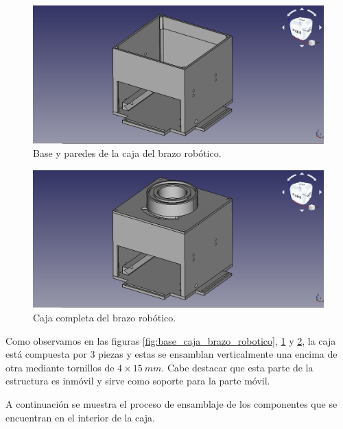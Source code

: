 \begin{figure}[H]
    \centering 
    \includegraphics[width=1\linewidth]{pictures/BaseYParedes.png}
    \caption{Base y paredes de la caja del brazo robótico.}
    \label{fig:base_paredes_caja_brazo_robotico}
\end{figure}

\begin{figure}[H]
    \centering 
    \includegraphics[width=1\linewidth]{pictures/CajaCompleta.png}
    \caption{Caja completa del brazo robótico.}
    \label{fig:caja_completa_brazo_robotico}
\end{figure}

Como observamos en las figuras \ref{fig:base_caja_brazo_robotico}, \ref{fig:base_paredes_caja_brazo_robotico} y \ref{fig:caja_completa_brazo_robotico}, la caja está compuesta por 3 piezas y estas se ensamblan verticalmente una encima de otra mediante tornillos de $4 \times 15~mm$.
Cabe destacar que esta parte de la estructura es inmóvil y sirve como soporte para la parte móvil.

A continuación se muestra el proceso de ensamblaje de los componentes que se encuentran en el interior de la caja.

